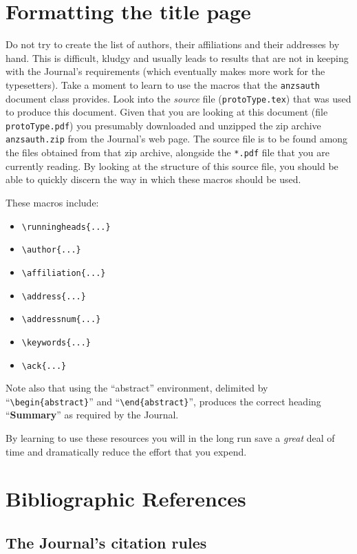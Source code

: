 \documentclass[times, doublespace]{anzsauth}
\begin{document}
\section{Formatting the title page}
\label{sec:titPage}

Do not try to create the list of authors, their affiliations
and their addresses by hand.  This is difficult, kludgy and
usually leads to results that are not in keeping with the
Journal's requirements (which eventually makes more work for
the typesetters).  Take a moment to learn to use the macros
that the \texttt{anzsauth} document class provides.  Look into
the \emph{source} file (\texttt{protoType.tex}) that was used to
produce this document.  Given that you are looking at this document
(file \texttt{protoType.pdf}) you presumably downloaded and unzipped
the zip archive \texttt{anzsauth.zip} from the Journal's web page.
The source file is to be found among the files obtained from
that zip archive, alongside the \texttt{*.pdf} file that you are
currently reading.  By looking at the structure of this source file,
you should be able to quickly discern the way in which these macros
should be used.

These macros include:
\begin{itemize}
\item \verb!\runningheads{...}!
\item \verb!\author{...}!
\item \verb!\affiliation{...}!
\item \verb!\address{...}!
\item \verb!\addressnum{...}!
\item \verb!\keywords{...}!
\item \verb!\ack{...}!
\end{itemize}
Note also that using the ``abstract'' environment, delimited by
``\verb!\begin{abstract}!'' and ``\verb!\end{abstract}!'',
produces the correct heading ``\textbf{Summary}'' as required by
the Journal.

By learning to use these resources you will in the long
run save a \emph{great} deal of time and dramatically reduce the
effort that you expend.

\section{Bibliographic References}
\label{sec:bibRef}

\subsection{The Journal's citation rules}
\label{sec:citeRules}
\end{document}
